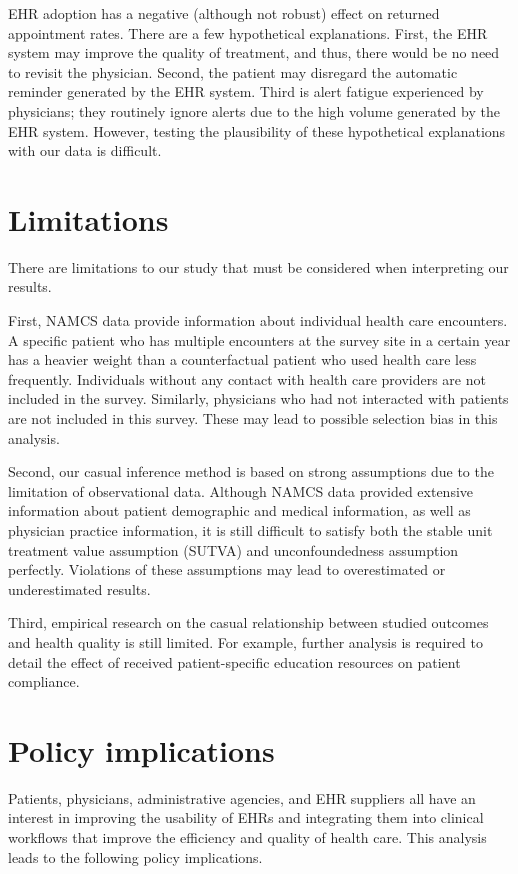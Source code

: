 \documentclass[12pt]{report}
\begin{document}
EHR adoption has a negative (although not robust) effect on returned appointment rates. There are a few hypothetical explanations. First, the EHR system may improve the quality of treatment, and thus, there would be no need to revisit the physician. Second, the patient may disregard the automatic reminder generated by the EHR system. Third is alert fatigue experienced by physicians; they routinely ignore alerts due to the high volume generated by the EHR system. However, testing the plausibility of these hypothetical explanations with our data is difficult.

\chapter{Limitations}
\label{chapter:limitations}
There are limitations to our study that must be considered when interpreting our results.

First, NAMCS data provide information about individual health care encounters. A specific patient who has multiple encounters at the survey site in a certain year has a heavier weight than a counterfactual patient who used health care less frequently. Individuals without any contact with health care providers are not included in the survey. Similarly, physicians who had not interacted with patients are not included in this survey. These may lead to possible selection bias in this analysis.

Second, our casual inference method is based on strong assumptions due to the limitation of observational data. Although NAMCS data provided extensive information about patient demographic and medical information, as well as physician practice information, it is still difficult to satisfy both the stable unit treatment value assumption (SUTVA) and unconfoundedness assumption perfectly. Violations of these assumptions may lead to overestimated or underestimated results.

Third, empirical research on the casual relationship between studied outcomes and health quality is still limited. For example, further analysis is required to detail the effect of received patient-specific education resources on patient compliance.

\chapter{Policy implications}
\label{chapter:policyimplications}
Patients, physicians, administrative agencies, and EHR suppliers all have an interest in improving the usability of EHRs and integrating them into clinical workflows that improve the efficiency and quality of health care. This analysis leads to the following policy implications.
\end{document}
